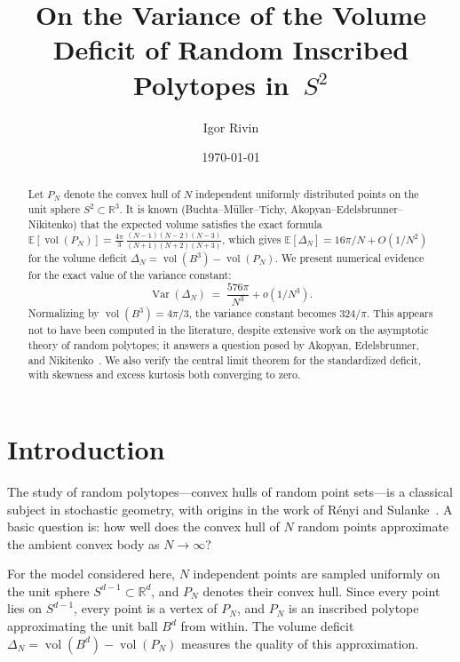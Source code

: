 \documentclass[11pt]{article}
\title{On the Variance of the Volume Deficit of Random Inscribed
Polytopes in~$S^2$}
\author{Igor Rivin}
\date{\today}
\begin{document}
\maketitle

\begin{abstract}
Let $P_N$ denote the convex hull of $N$ independent uniformly distributed
points on the unit sphere $S^2 \subset \mathbb{R}^3$.  It is known
(Buchta--M\"uller--Tichy, Akopyan--Edelsbrunner--Nikitenko) that the expected
volume satisfies the exact formula
$\mathbb{E}[\operatorname{vol}(P_N)] = \frac{4\pi}{3}\,
\frac{(N-1)(N-2)(N-3)}{(N+1)(N+2)(N+3)}$,
which gives $\mathbb{E}[\Delta_N] = 16\pi/N + O(1/N^2)$ for the volume
deficit $\Delta_N = \operatorname{vol}(B^3) - \operatorname{vol}(P_N)$.
We present numerical evidence for the exact value of the variance constant:
\[
  \operatorname{Var}(\Delta_N) \;=\; \frac{576\pi}{N^3} + o(1/N^3).
\]
Normalizing by $\operatorname{vol}(B^3) = 4\pi/3$, the variance constant
becomes $324/\pi$.  This appears not to have been computed in the literature,
despite extensive work on the asymptotic theory of random polytopes; it
answers a question posed by Akopyan, Edelsbrunner, and
Nikitenko~\cite{AEN2021}.  We also verify the central limit theorem for the
standardized deficit, with skewness and excess kurtosis both converging to
zero.
\end{abstract}

\section{Introduction}

The study of random polytopes---convex hulls of random point sets---is a
classical subject in stochastic geometry, with origins in the work of
R\'enyi and Sulanke~\cite{RS1963,RS1964}.  A basic question is: how
well does the convex hull of $N$ random points approximate the ambient
convex body as $N \to \infty$?

For the model considered here, $N$ independent points are sampled
uniformly on the unit sphere $S^{d-1} \subset \mathbb{R}^d$, and
$P_N$ denotes their convex hull.  Since every point lies on $S^{d-1}$,
every point is a vertex of $P_N$, and $P_N$ is an inscribed polytope
approximating the unit ball $B^d$ from within.  The volume deficit
$\Delta_N = \operatorname{vol}(B^d) - \operatorname{vol}(P_N)$
measures the quality of this approximation.
\end{document}
